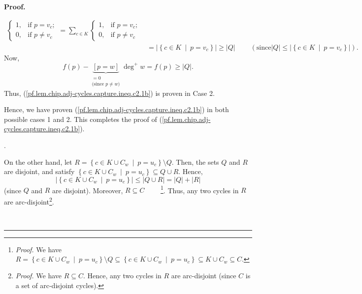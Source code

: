 \documentclass[numbers=enddot,12pt,final,onecolumn,notitlepage]{scrartcl}%
\theoremstyle{definition}
\newenvironment{proof}[1][Proof]{\noindent\textbf{#1.} }{\ \rule{0.5em}{0.5em}}
\let\sumnonlimits\sum
\renewcommand{\sum}{\sumnonlimits\limits}
\begin{document}
\begin{proof}
{\begin{align*}
{\begin{cases}
1, & \text{if }p=v_{c};\\
0, & \text{if }p\neq v_{c}%
\end{cases}
}=\sum_{c\in K}%
\begin{cases}
1, & \text{if }p=v_{c};\\
0, & \text{if }p\neq v_{c}%
\end{cases}
\\
&  =\left\vert \left\{  c\in K\ \mid\ p=v_{c}\right\}  \right\vert
\geq\left\vert Q\right\vert \ \ \ \ \ \ \ \ \ \ \left(  \text{since
}\left\vert Q\right\vert \leq\left\vert \left\{  c\in K\ \mid\ p=v_{c}%
\right\}  \right\vert \right)  .
\end{align*}
Now,%
\[
f\left(  p\right)  -\underbrace{\left[  p=w\right]  }%
_{\substack{=0\\\text{(since }p\neq w\text{)}}}\deg^{+}w=f\left(  p\right)
\geq\left\vert Q\right\vert .
\]
Thus, (\ref{pf.lem.chip.adj-cycles.capture.ineq.c2.1b}) is proven in Case 2.
\par
Hence, we have proven (\ref{pf.lem.chip.adj-cycles.capture.ineq.c2.1b}) in
both possible cases 1 and 2. This completes the proof of
(\ref{pf.lem.chip.adj-cycles.capture.ineq.c2.1b}).}.

On the other hand, let $R=\left\{  c\in K\cup C_{w}\ \mid\ p=u_{c}\right\}
\setminus Q$. Then, the sets $Q$ and $R$ are disjoint, and satisfy $\left\{
c\in K\cup C_{w}\ \mid\ p=u_{c}\right\}  \subseteq Q\cup R$. Hence,%
\begin{equation}
\left\vert \left\{  c\in K\cup C_{w}\ \mid\ p=u_{c}\right\}  \right\vert
\leq\left\vert Q\cup R\right\vert =\left\vert Q\right\vert +\left\vert
R\right\vert \label{pf.lem.chip.adj-cycles.capture.ineq.c2.4}%
\end{equation}
(since $Q$ and $R$ are disjoint). Moreover, $R\subseteq C$%
\ \ \ \ \footnote{\textit{Proof.} We have $R=\left\{  c\in K\cup C_{w}%
\ \mid\ p=u_{c}\right\}  \setminus Q\subseteq\left\{  c\in K\cup C_{w}%
\ \mid\ p=u_{c}\right\}  \subseteq K\cup C_{w}\subseteq C$.}. Thus, any two
cycles in $R$ are arc-disjoint\footnote{\textit{Proof.} We have $R\subseteq
C$. Hence, any two cycles in $R$ are arc-disjoint (since $C$ is a set of
arc-disjoint cycles).}.


\end{proof}
\end{document}
